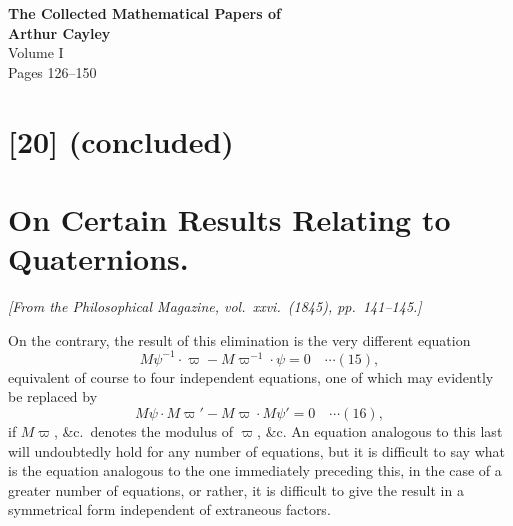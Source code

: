 \documentclass[12pt,a4paper]{article}
\begin{document}
\begin{center}
{\LARGE\bfseries The Collected Mathematical Papers of}\\[0.5em]
{\LARGE\bfseries Arthur Cayley}\\[1em]
{\Large Volume I}\\[1em]
{\large Pages 126--150}\\[2em]
\end{center}

\tableofcontents
\newpage

\section*{[20] (concluded)}
\section*{On Certain Results Relating to Quaternions.}

\textit{[From the Philosophical Magazine, vol.~xxvi.~(1845), pp.~141--145.]}

\bigskip
\setcounter{page}{126}

On the contrary, the result of this elimination is the very different equation
\begin{equation*}
M\psi^{-1}\cdot\varpi - M\varpi^{-1}\cdot\psi = 0 \quad \cdots(15),
\end{equation*}
equivalent of course to four independent equations, one of which may evidently be replaced by
\begin{equation*}
M\psi\cdot M\varpi' - M\varpi\cdot M\psi' = 0 \quad \cdots(16),
\end{equation*}
if $M\varpi$, \&c.\ denotes the modulus of $\varpi$, \&c. An equation analogous to this last will undoubtedly hold for any number of equations, but it is difficult to say what is the equation analogous to the one immediately preceding this, in the case of a greater number of equations, or rather, it is difficult to give the result in a symmetrical form independent of extraneous factors.
\end{document}
